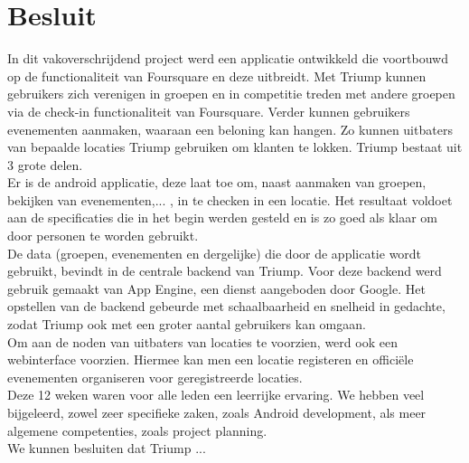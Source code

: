 
\chapter{Besluit}%

In dit vakoverschrijdend project werd een applicatie ontwikkeld die voortbouwd op de functionaliteit van Foursquare en deze uitbreidt.
Met Triump kunnen gebruikers zich verenigen in groepen en in competitie treden met andere groepen via de check-in functionaliteit van Foursquare.
Verder kunnen gebruikers evenementen aanmaken, waaraan een beloning kan hangen. Zo kunnen uitbaters van bepaalde locaties Triump gebruiken om klanten te lokken.
Triump bestaat uit 3 grote delen.\\
Er is de android applicatie, deze laat toe om, naast aanmaken van groepen, bekijken van evenementen,... , in te checken in een locatie.
Het resultaat voldoet aan de specificaties die in het begin werden gesteld en is zo goed als klaar om door personen te worden gebruikt.\\
De data (groepen, evenementen en dergelijke) die door de applicatie wordt gebruikt, bevindt in de centrale backend van Triump.
Voor deze backend werd gebruik gemaakt van App Engine, een dienst aangeboden door Google.
Het opstellen van de backend gebeurde met schaalbaarheid en snelheid in gedachte, zodat Triump ook met een groter aantal gebruikers kan omgaan.\\
Om aan de noden van uitbaters van locaties te voorzien, werd ook een webinterface voorzien. 
Hiermee kan men een locatie registeren en officiële evenementen organiseren voor geregistreerde locaties.\\

Deze 12 weken waren voor alle leden een leerrijke ervaring. We hebben veel bijgeleerd, zowel zeer specifieke zaken, zoals Android development, als meer algemene competenties, zoals project planning.\\
We kunnen besluiten dat Triump ... %